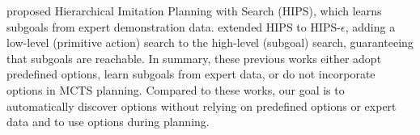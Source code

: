 \citet{kujanpaa_hierarchical_2023} proposed Hierarchical Imitation Planning with Search (HIPS), which learns subgoals from expert demonstration data.
\citet{kujanpaa_hybrid_2024} extended HIPS to HIPS-$\epsilon$, adding a low-level (primitive action) search to the high-level (subgoal) search, guaranteeing that subgoals are reachable.
In summary, these previous works either adopt predefined options, learn subgoals from expert data, or do not incorporate options in MCTS planning.
Compared to these works, our goal is to automatically discover options without relying on predefined options or expert data and to use options during planning.

%